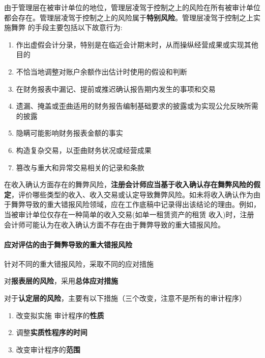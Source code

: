 \documentclass[UTF8,12pt]{ctexart}
\numberwithin{equation}{section} %
\numberwithin{figure}{section}
\numberwithin{table}{section}
\begin{document}
	由于管理层在被审计单位的地位，管理层凌驾于控制之上的风险在所有被审计单位都会存在。管理层凌驾于控制之上的风险属于\textbf{特别风险}。管理层凌驾于控制之上实施舞弊 的手段主要包括以下故意行为:
	\begin{enumerate}
		\item 作出虚假会计分录，特别是在临近会计期末时，从而操纵经营成果或实现其他目的
		
		\item 不恰当地调整对账户余额作出估计时使用的假设和判断
		
		\item 在财务报表中漏记、提前或推迟确认报告期内发生的事项和交易
		
		\item 遗漏、掩盖或歪曲适用的财务报告编制基础要求的披露或为实现公允反映所需的披露
		
		\item 隐瞒可能影响财务报表金额的事实
		
		\item 构造复杂交易，以歪曲财务状况或经营成果
		
		\item 篡改与重大和异常交易相关的记录和条款
	\end{enumerate}
	
	在收入确认方面存在的舞弊风险，\textbf{注册会计师应当基于收入确认存在舞弊风险的假定}，评价哪些类型的收入、收入交易或认定导致舞弊风险。如未将收入确认作为由于舞弊导致的重大错报风险领域，应在工作底稿中记录得出该结论的理由。例如，当被审计单位仅存在一种简单的收入交易(如单一租赁资产的租赁 收入)时，注册会计师可能认为在收入确认方面不存在由于舞弊导致的重大错报风险。
	
	\paragraph{应对评估的由于舞弊导致的重大错报风险}
	针对不同的重大错报风险，采取不同的应对措施
	
	对\textbf{报表层的风险}，采用\textbf{总体应对措施}
	
	对于\textbf{认定层的风险}，主要有以下措施（三个改变，注意不是所有的审计程序）
	\begin{enumerate}
		\item 改变拟实施 审计程序的\textbf{性质}
		
		\item 调整\textbf{实质性程序的时间}
		
		\item 改变审计程序的\textbf{范围}
	\end{enumerate}
	
\end{document}

